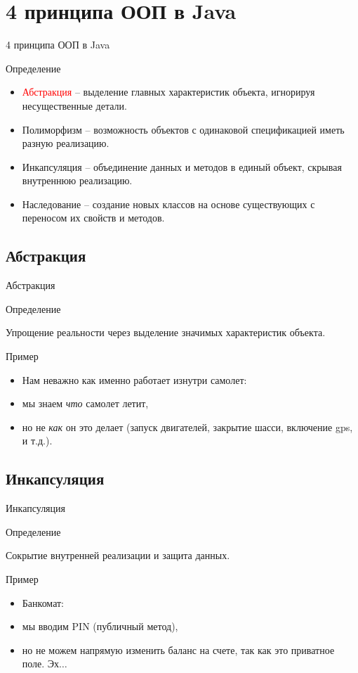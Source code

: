 \documentclass{beamer}
\newenvironment{rusdefinition}[1][Определение]{
    \begin{block}{#1}
}{\end{block}}
\newenvironment{rexample}[1][Пример]{\begin{exampleblock}{#1}}{\end{exampleblock}}
\begin{document}
\section{4 принципа ООП в Java}
\begin{frame}{4 принципа ООП в Java}
\begin{rusdefinition}
    \begin{itemize}
        \item \textcolor{red}{Абстракция} – выделение главных характеристик объекта, игнорируя несущественные детали.
        \item Полиморфизм – возможность объектов с одинаковой спецификацией иметь разную реализацию.
        \item Инкапсуляция – объединение данных и методов в единый объект, скрывая внутреннюю реализацию.
        \item Наследование – создание новых классов на основе существующих с переносом их свойств и методов.
    \end{itemize}
\end{rusdefinition}
\end{frame}

\subsection{Абстракция}
\begin{frame}{Абстракция}
\begin{rusdefinition}
    Упрощение реальности через выделение значимых характеристик объекта. 
\end{rusdefinition}
\begin{rexample}
    \begin{itemize}
        \item Нам неважно как именно работает изнутри самолет: 
        \item мы знаем \textit{что} самолет летит, 
        \item но не \textit{как} он это делает (запуск двигателей, закрытие шасси, включение gps, и т.д.).
    \end{itemize}
\end{rexample}
\end{frame}

\subsection{Инкапсуляция}
\begin{frame}{Инкапсуляция}
\begin{rusdefinition}   
Сокрытие внутренней реализации и защита данных.
\end{rusdefinition}
\begin{rexample}
    \begin{itemize}
        \item Банкомат: 
        \item мы вводим PIN (публичный метод), 
        \item но не можем напрямую изменить баланс на счете, так как это приватное поле. Эх$\dots$
    \end{itemize}
\end{rexample}
\end{frame}
\end{document}
